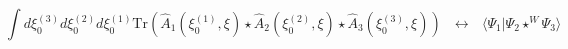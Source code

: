 \begin{equation}
\int d\xi _{0}^{(3)}d\xi _{0}^{(2)}d\xi _{0}^{(1)}\mathrm{Tr}(\hat{A}_1
(\xi _{0}^{(1)},\xi )\star \hat{A}_2(\xi _{0}^{(2)},\xi )\star 
\hat{A}_3(\xi _{0}^{(3)},\xi ))~~~\leftrightarrow ~~~\langle \Psi_1|
\Psi_2\star ^{W}\Psi_3\rangle 
\end{equation}

